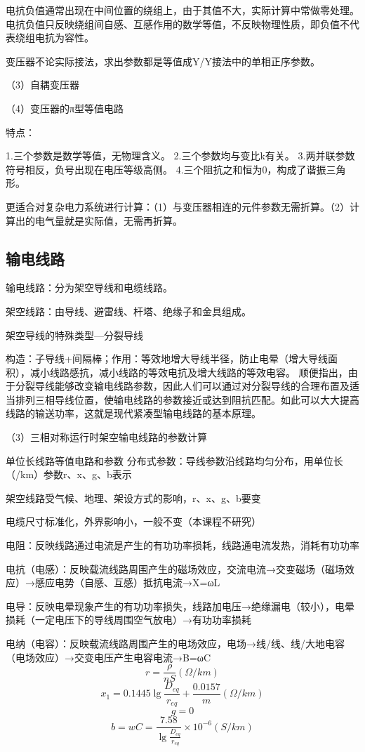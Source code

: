 \documentclass[UTF8, 12pt, a4paper]{ctexart}
\begin{document}
电抗负值通常出现在中间位置的绕组上，由于其值不大，实际计算中常做零处理。
电抗负值只反映绕组间自感、互感作用的数学等值，不反映物理性质，即负值不代表绕组电抗为容性。

变压器不论实际接法，求出参数都是等值成Y/Y接法中的单相正序参数。

（3）自耦变压器

（4）变压器的π型等值电路

特点：

1.三个参数是数学等值，无物理含义。
2.三个参数均与变比k有关。
3.两并联参数符号相反，负号出现在电压等级高侧。
4.三个阻抗之和恒为0，构成了谐振三角形。

更适合对复杂电力系统进行计算：（1）与变压器相连的元件参数无需折算。（2）计算出的电气量就是实际值，无需再折算。
\subsection{输电线路}

输电线路：分为架空导线和电缆线路。

架空线路：由导线、避雷线、杆塔、绝缘子和金具组成。

架空导线的特殊类型---分裂导线

构造：子导线+间隔棒；作用：等效地增大导线半径，防止电晕（增大导线面积），减小线路感抗，减小线路的等效电抗及增大线路的等效电容。
顺便指出，由于分裂导线能够改变输电线路参数，因此人们可以通过对分裂导线的合理布置及适当排列三相导线位置，使输电线路的参数接近或达到阻抗匹配。如此可以大大提高线路的输送功率，这就是现代紧凑型输电线路的基本原理。

（3）三相对称运行时架空输电线路的参数计算

单位长线路等值电路和参数
分布式参数：导线参数沿线路均匀分布，用单位长（/km）参数r、x、g、b表示

架空线路受气候、地理、架设方式的影响，r、x、g、b要变

电缆尺寸标准化，外界影响小，一般不变（本课程不研究）

电阻：反映线路通过电流是产生的有功功率损耗，线路通电流发热，消耗有功功率

电抗（电感）：反映载流线路周围产生的磁场效应，交流电流→交变磁场（磁场效应）→感应电势（自感、互感）抵抗电流→X=ωL

电导：反映电晕现象产生的有功功率损失，线路加电压→绝缘漏电（较小），电晕损耗（一定电压下的导线周围空气放电）→有功功率损耗

电纳（电容）：反映载流线路周围产生的电场效应，电场→线/线、线/大地电容（电场效应）→交变电压产生电容电流→B=ωC
\[r = \frac { \rho } { n S } (\Omega / km)
\]
\[x _ { 1 } = 0.1445 \lg {}{\frac { D _ { e q } } { r _{e q } }}+ \frac { 0.0157 } { m }(\Omega / km)
\]
\[g=0
\]
\[b = w C= \frac { 7.58 } {\lg{}\frac { D_{e q } }{ r_{eq} } }\times 10 ^ { - 6 }(S/ km)
\]
\end{document}
